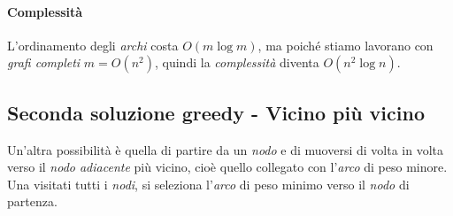 \paragraph{Complessità}
L'ordinamento degli \emph{archi} costa $O(m\log m)$, ma poiché stiamo lavorano
con \emph{grafi completi} $m=O(n^2)$, quindi la \emph{complessità} diventa
$O(n^2\log n)$.

\subsection{Seconda soluzione greedy - Vicino più vicino}
Un'altra possibilità è quella di partire da un \emph{nodo} e di muoversi di
volta in volta verso il \emph{nodo adiacente} più vicino, cioè quello collegato
con l'\emph{arco} di peso minore. Una visitati tutti i \emph{nodi}, si seleziona
l'\emph{arco} di peso minimo verso il \emph{nodo} di partenza.

